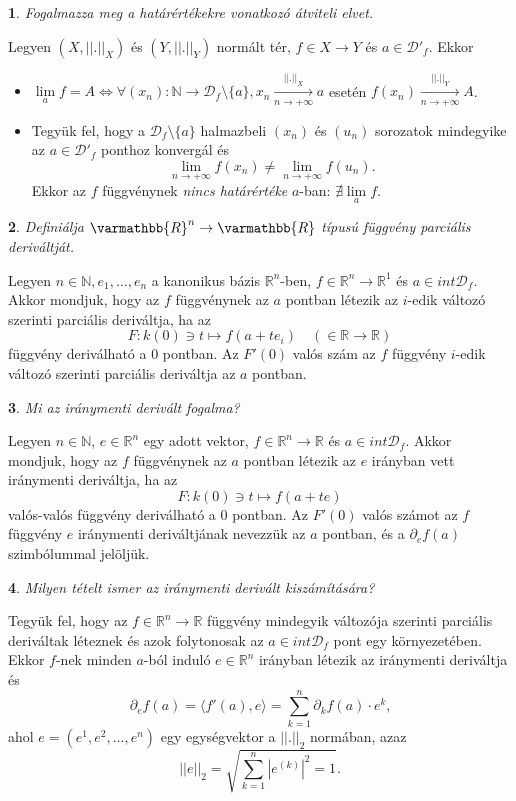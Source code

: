 \documentclass[a4paper]{article}
\def\R{\mathbb{R}}
\def\N{\mathbb{N}}
\def\RR{\varmathbb{R}}
\theoremstyle{qstyle}
\newtheorem{question}{}{}
\begin{document}
	\begin{question}
		Fogalmazza meg a határértékekre vonatkozó átviteli elvet.   
	\end{question}
	Legyen $(X, ||.||_{X})$ és $(Y, ||.||_{Y})$ normált tér, $f \in X \to Y$ és $a \in \mathcal{D}'_{f}$. Ekkor
	\begin{itemize}
		\item $\lim\limits_{a} f = A \Longleftrightarrow \forall (x_{n}) : \N \to \mathcal{D}_{f} \setminus \{a\}, x_{n} \xrightarrow[n \to +\infty]{||.||_{X}} a$ esetén $f(x_{n}) \xrightarrow[n \to +\infty]{||.||_{Y}} A$.
		\item Tegyük fel, hogy a $\mathcal{D}_{f} \setminus \{a\}$ halmazbeli $(x_{n})$ és $(u_{n})$ sorozatok mindegyike az $a \in \mathcal{D}'_{f}$ ponthoz konvergál és
		$$\lim\limits_{n \to +\infty} f(x_{n}) \ne \lim\limits_{n \to +\infty} f(u_{n})\text{.}$$
		Ekkor az $f$ függvénynek \emph{nincs határértéke} $a$-ban: $\nexists\lim\limits_{a} f$.
	\end{itemize}
	
	\begin{question}
		Definiálja $\RR^n \to \RR$ típusú függvény parciális deriváltját.   
	\end{question}
	Legyen $n \in \N, e_{1},\dots,e_{n}$ a kanonikus bázis $\R^{n}$-ben, $f \in \R^{n} \to \R^{1}$ és $a \in int\mathcal{D}_{f}$. Akkor mondjuk, hogy az $f$ függvénynek az $a$ pontban létezik az $i$-edik változó szerinti parciális deriváltja, ha az
	$$F : k(0) \ni t \mapsto f(a+te_{i}) \quad (\in \R \to \R)$$
	függvény deriválható a $0$ pontban. Az $F'(0)$ valós szám az $f$ függvény $i$-edik változó szerinti parciális deriváltja az $a$ pontban.
	
	\begin{question}
		Mi az iránymenti derivált fogalma?   
	\end{question}
	Legyen $n \in \N$, $e \in \R^{n}$ egy adott vektor, $f \in \R^{n} \to \R$ és $a \in int \mathcal{D}_{f}$. Akkor mondjuk, hogy az $f$ függvénynek az $a$ pontban létezik az $e$ irányban vett iránymenti deriváltja, ha az
	$$F : k(0) \ni t \mapsto f(a+te)$$
	valós-valós függvény deriválható a $0$ pontban. Az $F'(0)$ valós számot az $f$ függvény $e$ iránymenti deriváltjának nevezzük az $a$ pontban, és a $\partial_{e}f(a)$ szimbólummal jelöljük.
	
	\begin{question}
		Milyen tételt ismer az iránymenti derivált kiszámítására?   
	\end{question}
	Tegyük fel, hogy az $f \in \R^{n} \to \R$ függvény mindegyik változója szerinti parciális deriváltak léteznek és azok folytonosak az $a \in int\mathcal{D}_{f}$ pont egy környezetében. Ekkor $f$-nek minden $a$-ból induló $e \in \R^{n}$ irányban létezik az iránymenti deriváltja és
	$$\partial_{e}f(a) = \langle f'(a), e \rangle = \sum_{k=1}^{n} \partial_{k}f(a) \cdot e^{k}\text{,}$$
	ahol $e = (e^{1},e^{2},\dots,e^{n})$ egy egységvektor a $||.||_{2}$ normában, azaz
	$$||e||_{2} = \sqrt{\sum_{k=1}^{n}|e^{(k)}|^{2}=1}\text{.}$$
	
\end{document}
